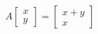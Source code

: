 \documentclass[preview]{standalone}
\begin{document}
\begin{align*}
A \begin{bmatrix} x \\ y \end{bmatrix}  =  \begin{bmatrix} x+y \\ x \end{bmatrix}
\end{align*}
\end{document}
